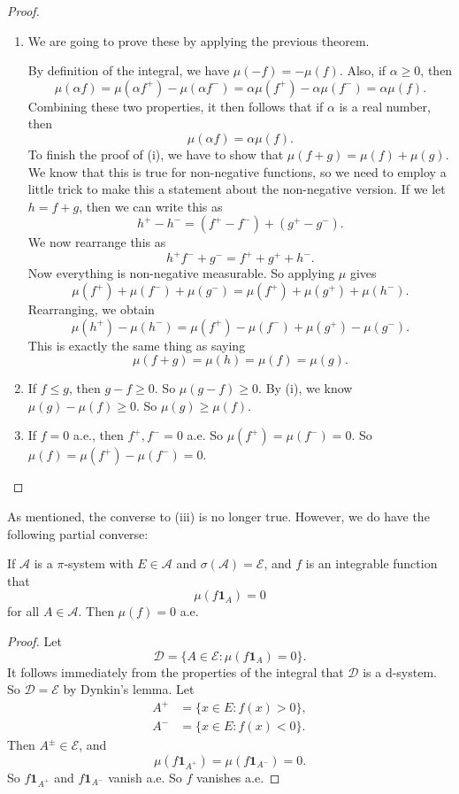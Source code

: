 \documentclass[a4paper]{article}
\begin{document}
\begin{proof}\leavevmode
  \begin{enumerate}
    \item We are going to prove these by applying the previous theorem.

      By definition of the integral, we have $\mu(-f) = - \mu(f)$. Also, if $\alpha \geq 0$, then
      \[
        \mu(\alpha f) = \mu(\alpha f^+) - \mu(\alpha f^-) = \alpha \mu(f^+) - \alpha \mu(f^-) = \alpha \mu(f).
      \]
      Combining these two properties, it then follows that if $\alpha$ is a real number, then
      \[
        \mu(\alpha f) = \alpha \mu(f).
      \]
      To finish the proof of (i), we have to show that $\mu(f + g) = \mu(f) + \mu(g)$. We know that this is true for non-negative functions, so we need to employ a little trick to make this a statement about the non-negative version. If we let $h = f + g$, then we can write this as
      \[
        h^+ - h^- = (f^+ - f^-) + (g^+ - g^-).
      \]
      We now rearrange this as
      \[
        h^ + f^- + g^- = f^+ + g^+ + h^-.
      \]
      Now everything is non-negative measurable. So applying $\mu$ gives
      \[
        \mu(f^+) + \mu(f^-) + \mu(g^-) = \mu(f^+) + \mu(g^+) + \mu(h^-).
      \]
      Rearranging, we obtain
      \[
        \mu(h^+) - \mu (h^-) = \mu(f^+) - \mu(f^-) + \mu(g^+) - \mu(g^-).
      \]
      This is exactly the same thing as saying
      \[
        \mu(f + g) = \mu(h) = \mu(f) = \mu(g).
      \]
    \item If $f \leq g$, then $g - f \geq 0$. So $\mu(g - f) \geq 0$. By (i), we know $\mu(g) - \mu(f) \geq 0$. So $\mu(g) \geq \mu(f)$.

    \item If $f = 0$ a.e., then $f^+, f^- = 0$ a.e. So $\mu(f^+) = \mu(f^-) = 0$. So $\mu(f) = \mu(f^+) - \mu(f^-) = 0$.
  \end{enumerate}
\end{proof}
As mentioned, the converse to (iii) is no longer true. However, we do have the following partial converse:
\begin{prop}
  If $\mathcal{A}$ is a $\pi$-system with $E \in \mathcal{A}$ and $\sigma(\mathcal{A}) = \mathcal{E}$, and $f$ is an integrable function that
  \[
    \mu(f\mathbf{1}_A) =0
  \]
  for all $A \in \mathcal{A}$. Then $\mu(f) = 0$ a.e.
\end{prop}

\begin{proof}
  Let
  \[
    \mathcal{D} = \{A \in \mathcal{E}: \mu (f\mathbf{1}_A) = 0\}.
  \]
  It follows immediately from the properties of the integral that $\mathcal{D}$ is a d-system. So $\mathcal{D} = \mathcal{E}$ by Dynkin's lemma. Let
  \begin{align*}
    A^+ &= \{x \in E: f(x) > 0\},\\
    A^- &= \{x \in E: f(x) < 0\}.
  \end{align*}
  Then $A^{\pm} \in \mathcal{E}$, and
  \[
    \mu(f \mathbf{1}_{A^+}) = \mu(f \mathbf{1}_{A^-}) = 0.
  \]
  So $f\mathbf{1}_{A^+}$ and $f \mathbf{1}_{A^-}$ vanish a.e. So $f$ vanishes a.e.
\end{proof}
\end{document}
